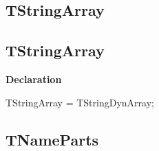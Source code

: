 \documentclass{report}
\newif\ifpdf
\begin{document}
\subsection*{\large{\textbf{TStringArray}}\normalsize\hspace{1ex}\hrulefill}
\else
\subsection*{TStringArray}
\fi
\label{PasDoc_Types-TStringArray}
\begin{list}{}{
\setlength{\itemindent}{0cm}
\setlength{\listparindent}{0cm}
\setlength{\leftmargin}{\evensidemargin}
\addtolength{\leftmargin}{\tmplength}
\settowidth{\labelsep}{X}
\addtolength{\leftmargin}{\labelsep}
\setlength{\labelwidth}{\tmplength}
}
\item[\textbf{Declaration}\hfill]
\ifpdf
\begin{flushleft}
\fi
\begin{ttfamily}
TStringArray = TStringDynArray;\end{ttfamily}

\ifpdf
\end{flushleft}
\fi

\end{list}
\ifpdf
\subsection*{\large{\textbf{TNameParts}}\normalsize\hspace{1ex}\hrulefill}
\else
\end{document}
